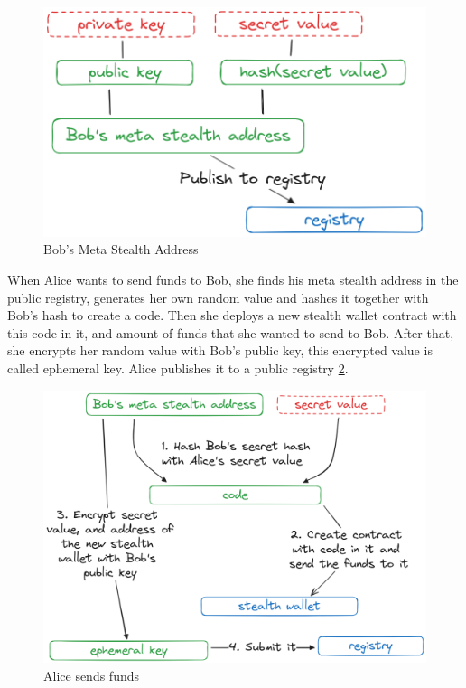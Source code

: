 \documentclass[conference,comsoc,10pt]{IEEEtran}
\begin{document}
    \begin{figure}[h]
        \centering
        \includegraphics[scale=0.20]{./assets/images/meta-stealth-address.png}
        \caption{Bob's Meta Stealth Address}
        \label{fig:bobs-meta-address}
    \end{figure}

    When Alice wants to send funds to Bob, she finds his meta stealth address
    in the public registry, generates her own random value and hashes it together
    with Bob's hash to create a code. Then she deploys a new stealth wallet
    contract with this code in it, and amount of funds that she wanted to send
    to Bob. After that, she encrypts her random value with Bob's public key,
    this encrypted value is called ephemeral key. Alice publishes it to a
    public registry \ref{fig:sending-funds}. 

    \begin{figure}[h]
        \centering
        \includegraphics[scale=0.19]{./assets/images/sending-funds.png}
        \caption{Alice sends funds}
        \label{fig:sending-funds}
    \end{figure}
\end{document}
